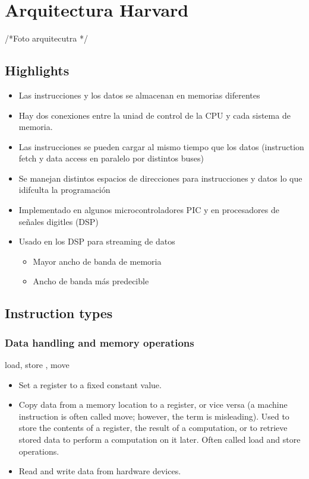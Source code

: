 \section{Arquitectura Harvard}
/*Foto arquitecutra */	
\subsection{Highlights}
\begin{itemize}
\item Las instrucciones y los datos se almacenan en memorias diferentes
\item Hay dos conexiones entre la uniad de control de la CPU y cada sistema de memoria.
\item Las instrucciones se pueden cargar al mismo tiempo que los datos (instruction fetch y data access en paralelo por distintos buses)
\item Se manejan distintos espacios de direcciones para instrucciones y datos lo que idifculta la programación
\item Implementado en algunos microcontroladores PIC y en procesadores de señales digitles (DSP) 
\item Usado en los DSP para streaming de datos
	\begin{itemize}
	\item Mayor ancho de banda de memoria
	\item Ancho de banda más predecible
	\end{itemize}
\end{itemize}


\subsection{Instruction types}
\subsubsection{Data handling and memory operations}
load, store , move
\begin{itemize}
	\item Set a register to a fixed constant value.
	\item Copy data from a memory location to a register, or vice versa (a machine instruction is often called move; however, the term is misleading). Used to store the contents of a register, the result of a computation, or to retrieve stored data to perform a computation on it later. Often called load and store operations.
	\item Read and write data from hardware devices.
\end{itemize}

